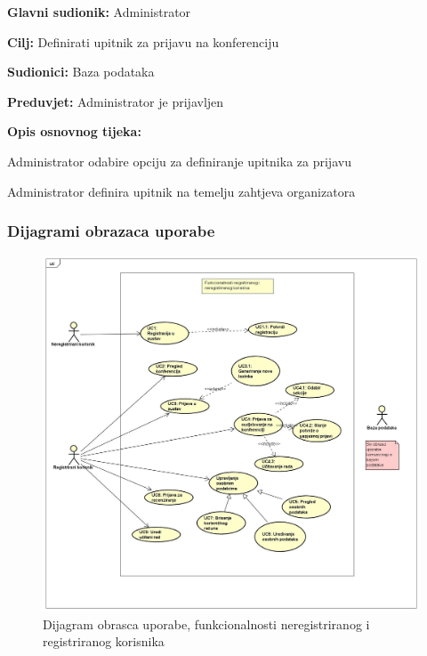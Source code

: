 	\noindent {}
	\begin{packed_item}
		
		\item \textbf{Glavni sudionik: }Administrator
		\item  \textbf{Cilj:} Definirati upitnik za prijavu na konferenciju
		\item  \textbf{Sudionici:} Baza podataka
		\item  \textbf{Preduvjet:} Administrator je prijavljen
		\item  \textbf{Opis osnovnog tijeka:}
		
		\item[] \begin{packed_enum}
			
			\item Administrator odabire opciju za definiranje upitnika za prijavu
			\item Administrator definira upitnik na temelju zahtjeva organizatora
			
		\end{packed_enum}
	\end{packed_item}
	
				\subsubsection{Dijagrami obrazaca uporabe}
				
				\begin{figure}[H]
					\includegraphics[width=1\linewidth]{slike/UCdijagram1} %
					\centering
					\caption{Dijagram obrasca uporabe, funkcionalnosti neregistriranog i registriranog korisnika}
					\label{fig:UC1} %
				\end{figure}
			
